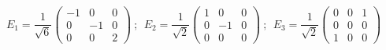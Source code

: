 \begin{equation}
E_1=\frac{1}{\sqrt{6}}\left(\begin{array}{ccc} -1&0&0\\ 0&-1&0\\ 0&0&2
\end{array}\right)
~;~~E_2=\frac{1}{\sqrt{2}}\left(\begin{array}{ccc} 1&0&0\\ 0&-1&0\\
0&0&0
\end{array}\right)
~;~~E_3=\frac{1}{\sqrt{2}}\left(\begin{array}{ccc} 0&0&1\\ 0&0&0\\
1&0&0
\end{array}\right)
\end{equation}

